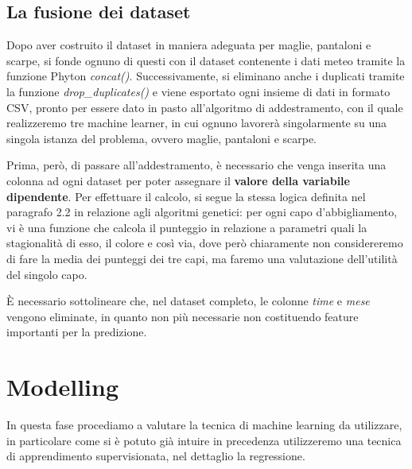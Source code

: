 \documentclass[a4paper, 11pt, oneside]{report}
\begin{document}
                \bigskip

                \subsection{La fusione dei dataset}
                Dopo aver costruito il dataset in maniera adeguata per maglie, pantaloni e scarpe, si fonde ognuno di
                questi con il dataset contenente i dati meteo tramite la funzione Phyton \textit{concat()}. Successivamente,
                si eliminano anche i duplicati tramite la funzione \textit{drop\_duplicates()} e viene esportato ogni insieme
                di dati in formato CSV, pronto per essere dato in pasto all'algoritmo di addestramento, con il quale realizzeremo
                tre machine learner, in cui ognuno lavorerà singolarmente su una singola istanza del problema, ovvero maglie, pantaloni
                e scarpe.\\
                \par \noindent Prima, però, di passare all'addestramento,
                è necessario che venga inserita una colonna ad ogni dataset per poter assegnare il \textbf{valore della variabile dipendente}.
                Per effettuare il calcolo, si segue la stessa logica definita nel paragrafo 2.2 in relazione agli algoritmi genetici:
                per ogni capo d'abbigliamento, vi è una funzione che calcola il punteggio in relazione a parametri quali la stagionalità
                di esso, il colore e così via, dove però chiaramente non considereremo di fare la media dei punteggi dei
                tre capi, ma faremo una valutazione dell'utilità del singolo capo.\\
                \par \noindent \`E necessario sottolineare che, nel dataset completo, le colonne \textit{time}
                e \textit{mese} vengono eliminate, in quanto non più necessarie non costituendo feature importanti per la predizione.

            \newpage
            \section{Modelling}
            In questa fase procediamo a valutare la tecnica di machine learning da utilizzare, in particolare come si è
            potuto già intuire in precedenza utilizzeremo una tecnica di apprendimento supervisionata, nel dettaglio la
            regressione.
\end{document}
